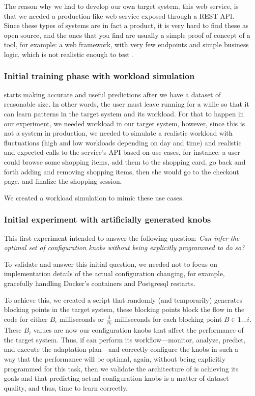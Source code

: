 The reason why we had to develop our own target system, this web service, is that we needed a production-like web service exposed through a REST API. Since these types of systems are in fact a product, it is very hard to find these as open source, and the ones that you find are usually a simple proof of concept of a tool, for example: a web framework, with very few endpoints and simple business logic, which is not realistic enough to test \projectname{}.

\subsubsection{Initial training phase with workload simulation}


\projectname{} starts making accurate and useful predictions after we have a dataset of reasonable size. In other words, the user must leave \projectname{} running for a while so that it can learn patterns in the target system and its workload. For that to happen in our experiment, we needed workload in our target system, however, since this is not a system in production, we needed to simulate a realistic workload with fluctuations (high and low workloads depending on day and time) and realistic and expected calls to the service's API based on use cases, for instance: a user could browse some shopping items, add them to the shopping card, go back and forth adding and removing shopping items, then she would go to the checkout page, and finalize the shopping session.

We created a workload simulation to mimic these use cases.

\subsubsection{Initial experiment with artificially generated knobs}

This first experiment intended to answer the following question: \emph{Can \projectname{} infer the optimal set of configuration knobs without being explicitly programmed to do so?}

To validate and answer this initial question, we needed not to focus on implementation details of the actual configuration changing, for example, gracefully handling Docker's containers and Postgresql restarts.

To achieve this, we created a script that randomly (and temporarily) generates blocking points in the target system, these blocking points block the flow in the code for either $B_i$ milliseconds or $\frac{1}{B_i}$ milliseconds for each blocking point $B \in 1 \dots i$. These $B_i$ values are now our configuration knobs that affect the performance of the target system. Thus, if \projectname{} can perform its workflow---monitor, analyze, predict, and execute the adaptation plan---and correctly configure the knobs in such a way that the performance will be optimal, again, without being explicitly programmed for this task, then we validate the architecture of \projectname{} is achieving its goals and that predicting actual configuration knobs is a matter of dataset quality, and thus, time to learn correctly.

